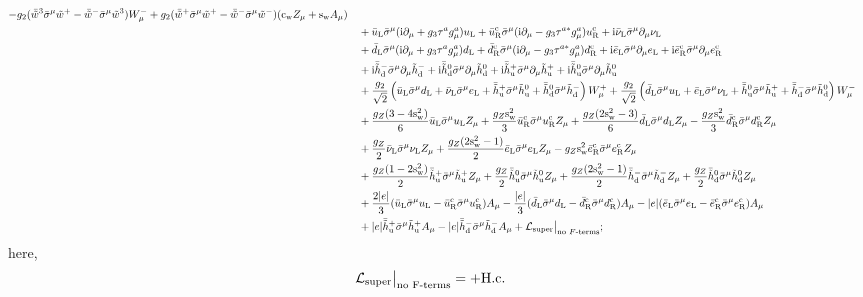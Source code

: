\documentclass[CheatSheet]{subfiles}
\begin{document}
\begin{align}
\begin{split}
 - g_2(\bar{\tiw}^{3}\bsigma^\mu\tiw^{+} - \bar{\tiw}^{-}\bsigma^\mu\tiw^{3})W_{\mu}^{-}
 + g_2(\bar{\tiw}^{+}\bsigma^\mu\tiw^{+} - \bar{\tiw}^{-}\bsigma^\mu\tiw^{-})(\co{\mathrm w}Z_{\mu} + \si{\mathrm w}A_{\mu})
\\&\quad
 + \buL\bsigma^\mu(\ii\partial_{\mu} + g_3\tau^ag_{\mu}^{a})\uL
 + \buR^{\cc}\bsigma^\mu(\ii\partial_{\mu} - g_3\tau^{a*} g_{\mu}^{a})\uR^{\cc}
 + {\ii} \bnuL\bsigma^\mu\partial_{\mu}\nuL
\\&\quad
 + \bdL\bsigma^\mu(\ii\partial_{\mu} + g_3\tau^ag_{\mu}^{a})\dL
 + \bdR^{\cc}\bsigma^\mu(\ii\partial_{\mu} - g_3\tau^{a*} g_{\mu}^{a})\dR^{\cc}
 + {\ii} \beL\bsigma^\mu\partial_{\mu}\eL
 + {\ii} \beR^{\cc }\bsigma^\mu\partial_{\mu}\eR^{\cc }
\\&\quad
 + {\ii} \bthdm\bsigma^\mu\partial_{\mu}\thdm
 + {\ii} \bthdz\bsigma^\mu\partial_{\mu}\thdz
 + {\ii} \bthup\bsigma^\mu\partial_{\mu}\thup
 + {\ii} \bthuz\bsigma^\mu\partial_{\mu}\thuz
\\&\quad
 + \frac{g_2}{\sqrt2} \left(\buL\bsigma^\mu\dL
 + \bnuL\bsigma^\mu\eL
 + \bthup\bsigma^\mu\thuz
 + \bthdz\bsigma^\mu\thdm\right) W_{\mu}^{+}
 + \frac{g_2}{\sqrt2} \left(\bdL\bsigma^\mu\uL
 + \beL\bsigma^\mu\nuL
 + \bthuz\bsigma^\mu\thup
 + \bthdm\bsigma^\mu\thdz\right) W_{\mu}^{-}
\\&\quad
+ \frac{g_Z(3-4\sisi{\mathrm w})}{6}\buL\bsigma^\mu\uL Z_{\mu}
 + \frac{g_Z\sisi{\mathrm w}}{3}\buR^{\cc}\bsigma^\mu\uR^{\cc}Z_{\mu}
+ \frac{g_Z(2\sisi{\mathrm w}-3)}{6}\bdL\bsigma^\mu\dL Z_{\mu}
 - \frac{g_Z\sisi{\mathrm w}}{3}\bdR^{\cc}\bsigma^\mu\dR^{\cc}Z_{\mu}
\\&\quad
+ \frac{g_Z}{2} \bnuL\bsigma^\mu\nuL Z_{\mu}
+ \frac{g_Z(2\sisi{\mathrm w}-1)}{2} \beL\bsigma^\mu\eL Z_{\mu}
 - g_Z\sisi{\mathrm w}\beR^{\cc }\bsigma^\mu\eR^{\cc }Z_{\mu}
\\&\quad
+ \frac{g_Z(1-2\sisi{\mathrm w})}{2}\bthup\bsigma^\mu\thup Z_{\mu}
+ \frac{g_Z}{2} \bthuz\bsigma^\mu\thuz Z_{\mu}
+ \frac{g_Z(2\sisi{\mathrm w} - 1)}{2} \bthdm\bsigma^\mu\thdm Z_{\mu}
+ \frac{g_Z}{2}\bthdz\bsigma^\mu\thdz Z_{\mu}
\\&\quad
 + \frac{2|e|}{3}(\buL\bsigma^\mu\uL - \buR^{\cc}\bsigma^\mu\uR^{\cc})A_{\mu}
 - \frac{|e|}{3}(\bdL\bsigma^\mu\dL - \bdR^{\cc}\bsigma^\mu\dR^{\cc})A_{\mu}
 - |e|(\beL\bsigma^\mu\eL-\beR^{\cc }\bsigma^\mu\eR^{\cc }) A_{\mu}
\\&\quad
 + |e|\bthup\bsigma^\mu\thup A_{\mu}
 - |e|\bthdm\bsigma^\mu\thdm A_{\mu}
 + \mathcal L\w{super}\big|_{\text{no $F$-terms}};
 \end{split}
\end{align}
here,
\begin{equation}
\begin{split}
  \mathcal L\w{super}\big|_{\text{no F-terms}}&=
  + \text{H.c.}
\end{split}
\end{equation}
\end{document}
